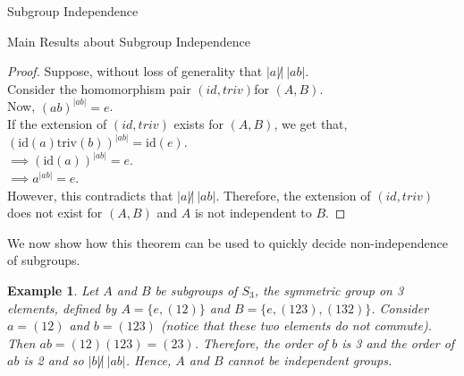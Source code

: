 \documentclass{article}
\newtheorem{example}{Example}[section]
\begin{document}
\begin{section}{Subgroup Independence}
\begin{subsection}{Main Results about Subgroup Independence}
			\begin{proof}
				Suppose, without loss of generality that $|a| \not | \ |ab|$.\\
				
				
				
				Consider the homomorphism pair $(id, triv)$for $(A, B)$.\\
				
				Now, $(ab)^{|ab|} = e$.\\
				
				
				If the extension of $(id, triv)$ exists for $(A, B)$, we get that,\\
				
				$(\text{id}(a)\text{triv}(b))^{|ab|} = \text{id}(e).$\\
				
				$\implies (\text{id}(a))^{|ab|}  = e$.\\
				
				$\implies a^{|ab|} = e$.\\
				
				However, this contradicts that $|a| \not | \ |ab|$. Therefore, the extension of $(id, triv)$ does not exist for $(A, B)$ and  $A$ is not independent to $B$.    
			\end{proof}
			
			\noindent We now show how this theorem can be used to quickly decide non-independence of subgroups. 
			
			\begin{example}\label{E2}
				\normalfont
				Let $A$ and $B$ be subgroups of $S_3$, the symmetric group on 3 elements, defined by $A = \{e, (12)\}$ and $B = \{e, (123), (132)\}$. Consider $a = (12)$ and $b = (123)$ (notice that these two elements do not commute). Then $ab = (12) (123) = (23)$. Therefore, the order of $b$ is 3 and the order of $ab$ is 2 and so $ |b| \not| \ |ab|$. Hence, $A$ and $B$ cannot be independent groups.
			\end{example}
			

\end{subsection}
\end{section}
\end{document}
